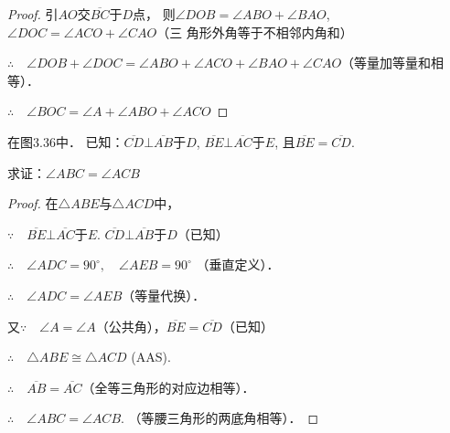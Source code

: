 \begin{proof}
 引$AO$交$\overline{BC}$于$D$点，
则$\angle DOB=\angle ABO+\angle BAO$, 
$\angle DOC=\angle ACO+\angle CAO$（三
角形外角等于不相邻内角和）

$\therefore\quad \angle DOB+\angle DOC=\angle ABO+\angle ACO+
\angle BAO+\angle CAO$（等量加等量和相等）．

$\therefore\quad \angle BOC=\angle A+\angle ABO+\angle ACO$
\end{proof}

\begin{figure}[htp]\centering
    \begin{minipage}[t]{0.48\textwidth}
    \centering
{}
    \caption{}
    \end{minipage}
    \begin{minipage}[t]{0.48\textwidth}
    \centering
    \caption{}
    \end{minipage}
    \end{figure}


\begin{example}
    在图3.36中．
    已知：$\overline{CD}\bot\overline{AB}$于$D$, $\overline{BE}\bot\overline{AC}$于$E$, 且$\overline{BE}=\overline{CD}$.

    求证：$\angle ABC=\angle ACB$
\end{example}

\begin{proof}
    在$\triangle ABE$与$\triangle ACD$中，

$\because\quad  \overline{BE}\bot\overline{AC}$于$E$. $\overline{CD}\bot\overline{AB}$于$D$（已知）

$\therefore\quad \angle ADC=90^{\circ},\quad \angle AEB=90^{\circ}$
（垂直定义）．

$\therefore\quad \angle ADC=\angle AEB$（等量代换）．

又$\because\quad \angle A=\angle A$（公共角），$\overline{BE}=\overline{CD}$（已知）

$\therefore\quad \triangle ABE\cong \triangle ACD$ (AAS).

$\therefore\quad \overline{AB}=\overline{AC}$（全等三角形的对应边相等）．

$\therefore\quad \angle ABC=\angle ACB$. （等腰三角形的两底角相等）．
\end{proof}


